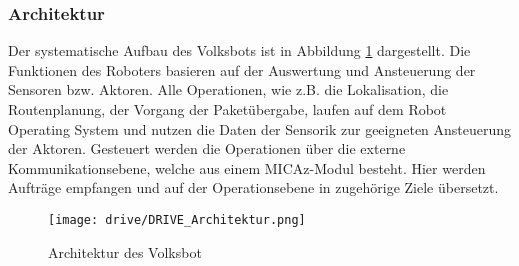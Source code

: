 \subsubsection{Architektur}

Der systematische Aufbau des Volksbots ist in Abbildung \ref{fig:architecture_volksbot} dargestellt. Die Funktionen des Roboters basieren auf der Auswertung und Ansteuerung der Sensoren bzw. Aktoren. Alle Operationen, wie z.B. die Lokalisation, die Routenplanung, der Vorgang der Paketübergabe, laufen auf dem Robot Operating System und nutzen die Daten der Sensorik zur geeigneten Ansteuerung der Aktoren. Gesteuert werden die Operationen über die externe Kommunikationsebene, welche aus einem MICAz-Modul besteht. Hier werden Aufträge empfangen und auf der Operationsebene in zugehörige Ziele übersetzt.

\begin{figure}[h!]
 \centering
		\texttt{[image: drive/DRIVE\_Architektur.png]}
	\caption{Architektur des Volksbot}
	\label{fig:architecture_volksbot}
\end{figure}

